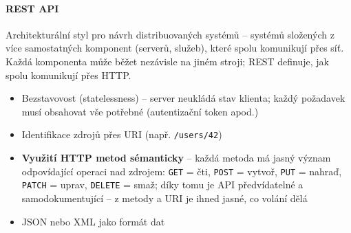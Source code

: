 \paragraph{REST API}
Architekturální styl pro návrh distribuovaných systémů -- systémů složených z více samostatných
komponent (serverů, služeb), které spolu komunikují přes síť. Každá komponenta může běžet
nezávisle na jiném stroji; REST definuje, jak spolu komunikují přes HTTP.
\begin{itemize}
  \item Bezstavovost (statelessness) -- server neukládá stav klienta; každý požadavek musí
    obsahovat vše potřebné (autentizační token apod.)
  \item Identifikace zdrojů přes URI (např. \texttt{/users/42})
  \item \textbf{Využití HTTP metod sémanticky} -- každá metoda má jasný význam odpovídající
    operaci nad zdrojem: \texttt{GET} = čti, \texttt{POST} = vytvoř, \texttt{PUT} = nahraď,
    \texttt{PATCH} = uprav, \texttt{DELETE} = smaž; díky tomu je API předvídatelné a
    samodokumentující -- z metody a URI je ihned jasné, co volání dělá
  \item JSON nebo XML jako formát dat
\end{itemize}

